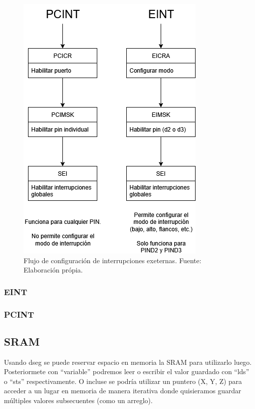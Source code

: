    \begin{figure}[H]
    \centering
    \includegraphics[width=0.7\linewidth]{./Anexos/Marco Teorico/External Interrupts/Interrupt diagram.png}
    \caption{Flujo de configuración de interrupciones exeternas. Fuente: Elaboración própia.}
    \label{fig:InterruptDiagram}
    \end{figure}


    \subsubsection{EINT}


    \subsubsection{PCINT}

\subsection{SRAM}


Usando dseg se puede reservar espacio en memoria la SRAM para utilizarlo luego. Posteriormete con ``variable'' podremos leer o escribir el valor guardado con ``lds'' o ``sts'' respectivamente. O incluse se podría utilizar un puntero (X, Y, Z) para acceder a un lugar en memoria de manera iterativa donde quisieramos guardar múltiples valores subsecuentes (como un arreglo). 

